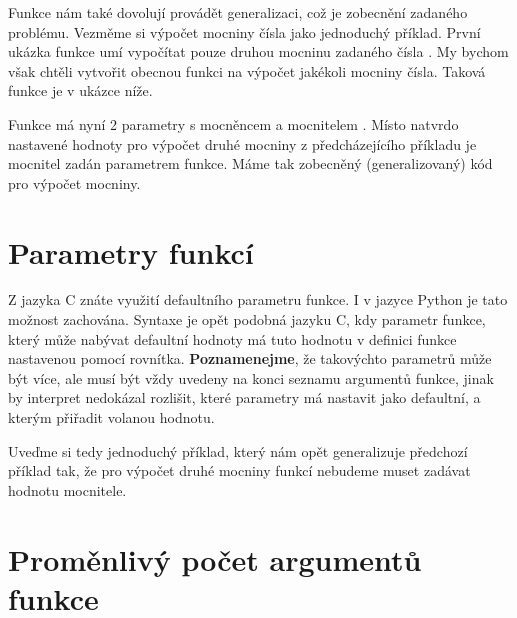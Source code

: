 Funkce nám také dovolují provádět generalizaci, což je zobecnění zadaného problému.
Vezměme si výpočet mocniny čísla jako jednoduchý příklad. První ukázka funkce  umí
vypočítat pouze druhou mocninu zadaného čísla . My bychom však chtěli vytvořit obecnou
funkci na výpočet jakékoli mocniny čísla. Taková funkce je v ukázce níže.


Funkce  má nyní 2 parametry s mocněncem  a mocnitelem . Místo
natvrdo nastavené hodnoty  pro výpočet druhé mocniny z předcházejícího příkladu je mocnitel
zadán parametrem funkce. Máme tak zobecněný (generalizovaný) kód pro výpočet mocniny.

\section{Parametry funkcí}

Z jazyka C znáte využití defaultního parametru funkce. I v jazyce Python je tato možnost zachována.
Syntaxe je opět podobná jazyku C, kdy parametr funkce, který může nabývat defaultní hodnoty má
tuto hodnotu v definici funkce nastavenou pomocí rovnítka.
\textbf{Poznamenejme}, že takovýchto parametrů
může být více, ale musí být vždy uvedeny na konci seznamu argumentů funkce, jinak by interpret
nedokázal rozlišit, které parametry má nastavit jako defaultní, a kterým přiřadit volanou hodnotu.

Uveďme si tedy jednoduchý příklad, který nám opět generalizuje předchozí příklad tak, že pro výpočet
druhé mocniny funkcí  nebudeme muset zadávat hodnotu mocnitele.



\section{Proměnlivý počet argumentů funkce}

